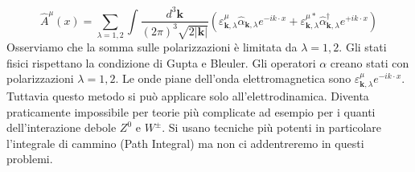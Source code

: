 $$
\hat{A}^\mu(x) = \sum_{\lambda=1,2} \int \frac{d^3\mathbf{k}}{(2\pi)^3 \sqrt{2|\mathbf{k}|}} \left( \varepsilon^\mu_{\mathbf{k},\lambda} \hat{\alpha}_{\mathbf{k},\lambda} e^{-ik\cdot x} + \varepsilon^{\mu *}_{\mathbf{k},\lambda} \hat{\alpha}_{\mathbf{k},\lambda}^\dagger e^{+ik\cdot x} \right)
$$
Osserviamo che la somma sulle polarizzazioni è limitata da $\lambda=1,2$. Gli stati fisici rispettano la condizione di Gupta e Bleuler. Gli operatori $\alpha$ creano stati con polarizzazioni $\lambda=1,2$. Le onde piane dell'onda elettromagnetica sono $\varepsilon_{\mathbf{k},\lambda}^\mu e^{-ik\cdot x}$. Tuttavia questo metodo si può applicare solo all'elettrodinamica. Diventa praticamente impossibile per teorie più complicate ad esempio per i quanti dell'interazione debole $Z^{0}$ e $W^{\pm}$. Si usano tecniche più potenti in particolare l'integrale di cammino (Path Integral) ma non ci addentreremo in questi problemi.
